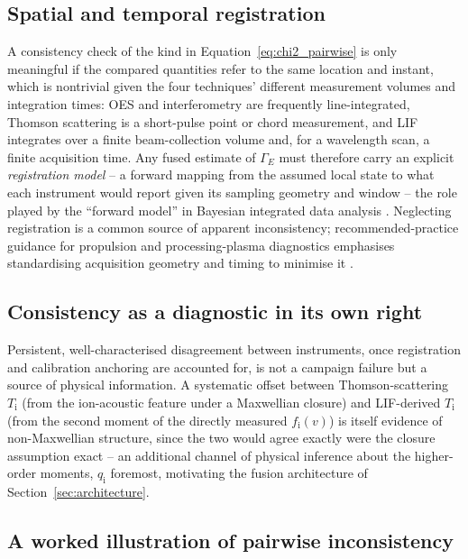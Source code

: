 \subsection{Spatial and temporal registration}

A consistency check of the kind in Equation~\eqref{eq:chi2_pairwise} is only meaningful if the compared quantities refer to the same location and instant, which is nontrivial given the four techniques' different measurement volumes and integration times: OES and interferometry are frequently line-integrated, Thomson scattering is a short-pulse point or chord measurement, and LIF integrates over a finite beam-collection volume and, for a wavelength scan, a finite acquisition time. Any fused estimate of $\Gamma_{E}$ must therefore carry an explicit \emph{registration model} -- a forward mapping from the assumed local state to what each instrument would report given its sampling geometry and window -- the role played by the ``forward model'' in Bayesian integrated data analysis \cite{ref0713}. Neglecting registration is a common source of apparent inconsistency; recommended-practice guidance for propulsion and processing-plasma diagnostics emphasises standardising acquisition geometry and timing to minimise it \cite{ref0511,ref0490}.

\subsection{Consistency as a diagnostic in its own right}

Persistent, well-characterised disagreement between instruments, once registration and calibration anchoring are accounted for, is not a campaign failure but a source of physical information. A systematic offset between Thomson-scattering $T_{\mathrm{i}}$ (from the ion-acoustic feature under a Maxwellian closure) and LIF-derived $T_{\mathrm{i}}$ (from the second moment of the directly measured $f_{\mathrm{i}}(v)$) is itself evidence of non-Maxwellian structure, since the two would agree exactly were the closure assumption exact -- an additional channel of physical inference about the higher-order moments, $q_{\mathrm{i}}$ foremost, motivating the fusion architecture of Section~\ref{sec:architecture}.

\subsection{A worked illustration of pairwise inconsistency}


